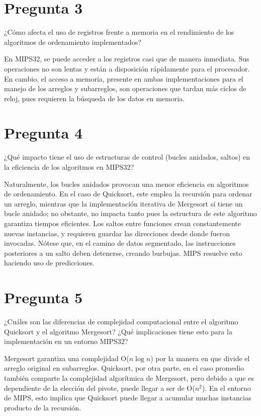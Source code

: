 \documentclass[12pt]{article}
\begin{document}
\section*{Pregunta 3}
¿Cómo afecta el uso de registros frente a memoria en el rendimiento de los algoritmos de ordenamiento implementados?

En MIPS32, se puede acceder a los registros casi que de manera inmediata. Sus operaciones no son lentas y están a disposición rápidamente para el procesador. En cambio, el acceso a memoria, presente en ambas implementaciones para el manejo de los arreglos y subarreglos, son operaciones que tardan más ciclos de reloj, pues requieren la búsqueda de los datos en memoria.

\section*{Pregunta 4}
¿Qué impacto tiene el uso de estructuras de control (bucles anidados, saltos) en la eficiencia de los algoritmos en MIPS32?

Naturalmente, los bucles anidados provocan una menor eficiencia en algoritmos de ordenamiento. En el caso de Quicksort, este emplea la recursión para ordenar un arreglo, mientras que la implementación iterativa de Mergesort sí tiene un bucle anidado; no obstante, no impacta tanto pues la estructura de este algoritmo garantiza tiempos eficientes. Los saltos entre funciones crean constantemente nuevas instancias, y requieren guardar las direcciones desde donde fueron invocadas. Nótese que, en el camino de datos segmentado, las instrucciones posteriores a un salto deben detenerse, creando burbujas. MIPS resuelve esto haciendo uso de predicciones.

\section*{Pregunta 5}
¿Cuáles son las diferencias de complejidad computacional entre el algoritmo Quicksort y el algoritmo Mergesort? ¿Qué implicaciones tiene esto para la implementación en un entorno MIPS32?

Mergesort garantiza una complejidad O($n \log n$) por la manera en que divide el arreglo original en subarreglos. Quicksort, por otra parte, en el caso promedio también comparte la complejidad algorítmica de Mergesort, pero debido a que es dependiente de la elección del pivote, puede llegar a ser de O($n^2$). En el entorno de MIPS, esto implica que Quicksort puede llegar a acumular muchas instancias producto de la recursión.
\end{document}
